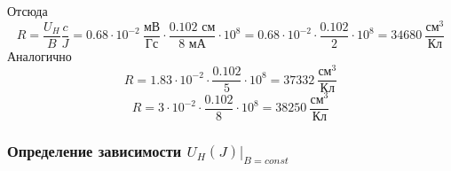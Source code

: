 Отсюда
\begin{equation}
	R=\frac{U_H}{B}\frac{c}{J}=0.68\cdot10^{-2}\ \frac{\text{мВ}}{\text{Гс}}\cdot \frac{0.102\text{ см}}{8 \text{ мА}}\cdot 10^8=
	0.68\cdot10^{-2}\cdot \frac{0.102}{2}\cdot 10^8=34680\ \frac{\text{см}^3}{\text{Кл}}
\end{equation}
Аналогично
\begin{equation}
	R=1.83\cdot10^{-2}\cdot \frac{0.102}{5}\cdot 10^8=37332\ \frac{\text{см}^3}{\text{Кл}}
\end{equation}
\begin{equation}
	R=3\cdot10^{-2}\cdot \frac{0.102}{8}\cdot 10^8=38250\ \frac{\text{см}^3}{\text{Кл}}
\end{equation}

\subsubsection{Определение зависимости $U_{H}(J)|_{B=const}$}

